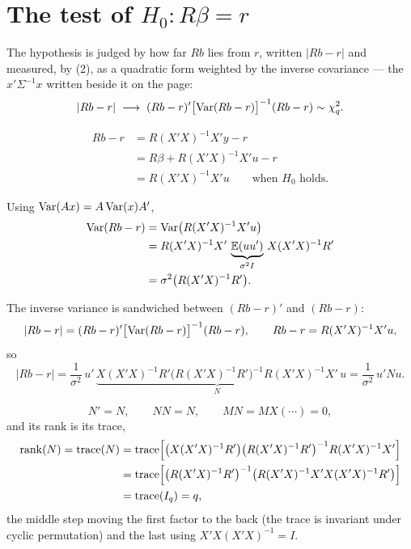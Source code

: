 \documentclass[11pt]{article}
\begin{document}
\section{The test of $H_{0} : R\beta = r$}

The hypothesis is judged by how far $Rb$ lies from $r$, written $|Rb - r|$ and
measured, by (2), as a quadratic form weighted by the inverse covariance ---
the $x'\Sigma^{-1}x$ written beside it on the page:
\[ |Rb - r| \;\longrightarrow\; (Rb - r)'\bigl[\operatorname{Var}(Rb - r)\bigr]^{-1}(Rb - r) \sim \chi^{2}_{q}. \]

\[
\begin{aligned}
Rb - r &= R(X'X)^{-1}X'y - r\\
       &= R\beta + R(X'X)^{-1}X'u - r\\
       &= R(X'X)^{-1}X'u \qquad\text{when } H_{0} \text{ holds}.
\end{aligned}
\]

Using $\operatorname{Var}(Ax) = A\operatorname{Var}(x)A'$,
\[
\begin{aligned}
\operatorname{Var}(Rb - r) &= \operatorname{Var}\bigl(R(X'X)^{-1}X'u\bigr)\\
             &= R(X'X)^{-1}X'\,\underbrace{\mathbb{E}(uu')}_{\sigma^{2}I}\,X(X'X)^{-1}R'\\
             &= \sigma^{2}\bigl(R(X'X)^{-1}R'\bigr).
\end{aligned}
\]

The inverse variance is sandwiched between $(Rb - r)'$ and $(Rb - r)$:
\[ |Rb - r| = (Rb - r)'\bigl[\operatorname{Var}(Rb - r)\bigr]^{-1}(Rb - r), \qquad
   Rb - r = R(X'X)^{-1}X'u, \]
so
\[ |Rb - r| = \frac{1}{\sigma^{2}}\,u'\,\underbrace{X(X'X)^{-1}R'\bigl(R(X'X)^{-1}R'\bigr)^{-1}R(X'X)^{-1}X'}_{N}\,u
   = \frac{1}{\sigma^{2}}\,u'Nu. \]

\[ N' = N, \qquad NN = N, \qquad MN = MX(\cdots) = 0, \]
and its rank is its trace,
\[
\begin{aligned}
\operatorname{rank}(N) = \operatorname{trace}(N)
 &= \operatorname{trace}\Bigl[\bigl(X(X'X)^{-1}R'\bigr)\bigl(R(X'X)^{-1}R'\bigr)^{-1}R(X'X)^{-1}X'\Bigr]\\
 &= \operatorname{trace}\Bigl[\bigl(R(X'X)^{-1}R'\bigr)^{-1}\bigl(R(X'X)^{-1}X'X(X'X)^{-1}R'\bigr)\Bigr]\\
 &= \operatorname{trace}(I_{q}) = q,
\end{aligned}
\]
the middle step moving the first factor to the back (the trace is invariant under
cyclic permutation) and the last using $X'X(X'X)^{-1} = I$.
\end{document}
